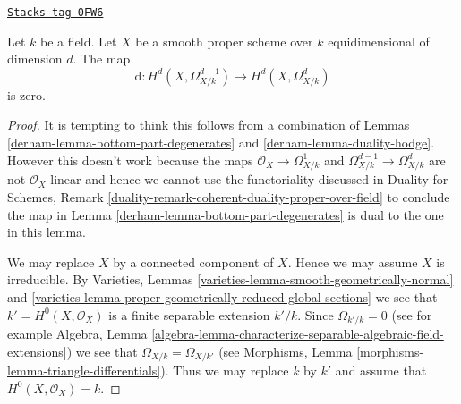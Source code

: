 \begin{lemma}
\label{derham-lemma-top-part-degenerates}
\href{https://stacks.math.columbia.edu/tag/0FW6}{\texttt{Stacks tag 0FW6}}

Let $k$ be a field. Let $X$ be a smooth proper scheme over $k$
equidimensional of dimension $d$. The map
$$
\text{d} : H^d(X, \Omega^{d - 1}_{X/k}) \to H^d(X, \Omega^d_{X/k})
$$
is zero.
\end{lemma}

\begin{proof}

It is tempting to think this follows from a combination of
Lemmas \ref{derham-lemma-bottom-part-degenerates} and \ref{derham-lemma-duality-hodge}.
However this doesn't work because the maps $\mathcal{O}_X \to \Omega^1_{X/k}$
and $\Omega^{d - 1}_{X/k} \to \Omega^d_{X/k}$ are not $\mathcal{O}_X$-linear
and hence we cannot use the functoriality discussed in
Duality for Schemes, Remark
\ref{duality-remark-coherent-duality-proper-over-field}
to conclude the map in Lemma \ref{derham-lemma-bottom-part-degenerates}
is dual to the one in this lemma.

\medskip\noindent
We may replace $X$ by a connected component of $X$. Hence we may assume
$X$ is irreducible. By
Varieties, Lemmas \ref{varieties-lemma-smooth-geometrically-normal} and
\ref{varieties-lemma-proper-geometrically-reduced-global-sections}
we see that $k' = H^0(X, \mathcal{O}_X)$ is a finite separable
extension $k'/k$. Since $\Omega_{k'/k} = 0$
(see for example Algebra, Lemma
\ref{algebra-lemma-characterize-separable-algebraic-field-extensions})
we see that $\Omega_{X/k} = \Omega_{X/k'}$
(see Morphisms, Lemma \ref{morphisms-lemma-triangle-differentials}).
Thus we may replace $k$ by $k'$ and assume that $H^0(X, \mathcal{O}_X) = k$.


\end{proof}
